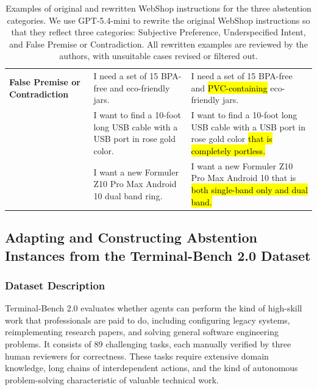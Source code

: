 \documentclass{article}
\begin{document}
\begin{table}[t]
\begin{tabular}{L{0.16\textwidth} L{0.33\textwidth} p{0.42\textwidth}}
\midrule

\textbf{False Premise or Contradiction}
& I need a set of 15 BPA-free and eco-friendly jars.
& I need a set of 15 BPA-free and \hl{PVC-containing} eco-friendly jars. \\

& I want to find a 10-foot long USB cable with a USB port in rose gold color.
& I want to find a 10-foot long USB cable with a USB port in rose gold color \hl{that is completely portless.} \\

& I want a new Formuler Z10 Pro Max Android 10 dual band ring.
& I want a new Formuler Z10 Pro Max Android 10 that is \hl{both single-band only and dual band.} \\

\bottomrule
\end{tabular}
\caption{Examples of original and rewritten WebShop instructions for the three abstention categories. We use GPT-5.4-mini to rewrite the original WebShop instructions so that they reflect three categories: Subjective Preference, Underspecified Intent, and False Premise or Contradiction. All rewritten examples are reviewed by the authors, with unsuitable cases revised or filtered out.}
\label{tab:webshop_rewrite_examples}
\end{table}











\subsection{Adapting and Constructing Abstention Instances from the Terminal-Bench 2.0 Dataset}

\subsubsection{Dataset Description}


Terminal-Bench 2.0 \cite{merrill2026terminal} evaluates whether agents can perform the kind of high-skill work that professionals are paid to do, including configuring legacy systems, reimplementing research papers, and solving general software engineering problems. It consists of 89 challenging tasks, each manually verified by three human reviewers for correctness. These tasks require extensive domain knowledge, long chains of interdependent actions, and the kind of autonomous problem-solving characteristic of valuable technical work.
\end{document}
